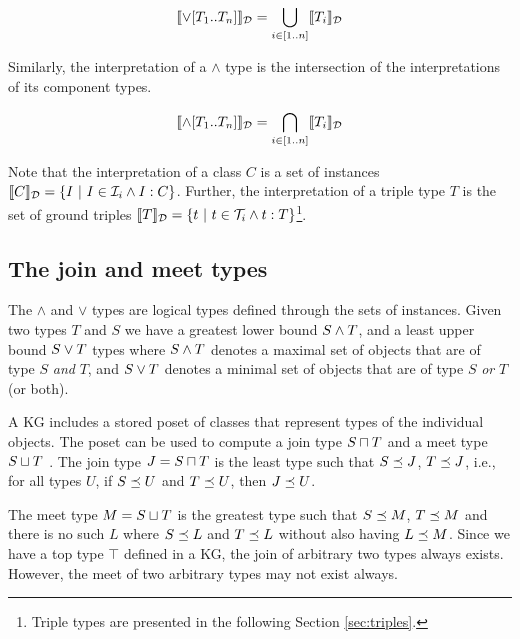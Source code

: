 \documentclass[runningheads]{llncs}
\newcommand{\I}{{\cal I}}
\newcommand{\T}{{\cal T}}
\newcommand{\memo}[1]{}
\begin{document}
\begin{displaymath}
  \llbracket\lor[T_1..T_n]\rrbracket_{\cal D} = \bigcup_{i\in[1..n]}\llbracket\/T_i\rrbracket_{\cal D}
\end{displaymath}

Similarly, the interpretation of a $\land$ type is the intersection of
the interpretations of its component types.

\begin{displaymath}
\llbracket\land[T_1..T_n]\rrbracket_{\cal D} = \bigcap_{i\in[1..n]}\llbracket\/T_i\rrbracket_{\cal D}
\end{displaymath}

Note that the interpretation of a class $C$ is a set of instances
$\llbracket\/C\rrbracket_\D=\{I\ |\ I\in\I_i\land\/I:C\}$. Further, the
interpretation of a triple type $T$ is the set of ground triples
$\llbracket\/T\rrbracket_\D=\{t\ |\ t\in\T_i\land\/t:T\}$\footnote{Triple
  types are presented in the following Section
  \ref{sec:triples}.}\cite{Savnik2025}.

\memo{Put together the base types of ground identifiers using $\land$ type.}
\memo{First, the base type of an ground identifier is the $\land$ of all base types.}
\memo{The \emph{base type} of a ground identifier is defined explicitely!}





\subsection{The join and meet types}

The $\land$ and $\lor$ types are logical types defined through the
sets of instances. Given two types $T$ and $S$ we have a greatest
lower bound $S\land\/T$, and a least upper bound $S\lor\/T$ types
where $S\land\/T$ denotes a maximal set of objects that are of type
$S$ \emph{and} $T$, and $S\lor\/T$ denotes a minimal set of objects
that are of type $S$ \emph{or} $T$ (or both).

A KG includes a stored poset of classes that represent types of the
individual objects. The poset can be used to compute a join type
$S\sqcap\/T$ and a meet type $S\sqcup\/T$ \cite{Pierce2002}. The join
type $J=S\sqcap\/T$ is the least type such that $S\preceq\/J$,
$T\preceq\/J$, i.e., for all types $U$, if $S\preceq\/U$ and
$T\preceq\/U$, then $J\preceq\/U$.

The meet type $M=S\sqcup\/T$ is the greatest type such that
$S\preceq\/M$, $T\preceq\/M$ and there is no such $L$ where
$S\preceq\/L$ and $T\preceq\/L$ without also having $L\preceq\/M$.
Since we have a top type $\top$ defined in a KG, the join of arbitrary
two types always exists. However, the meet of two arbitrary types may
not exist always. 
\end{document}
